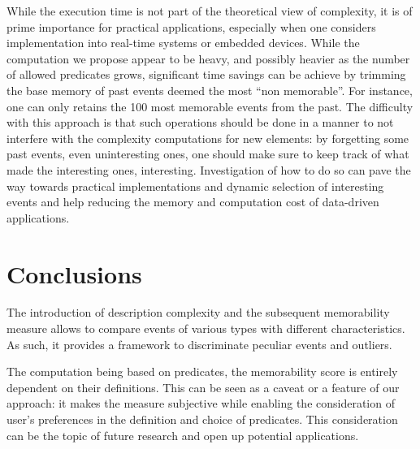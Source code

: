 \documentclass[entropy,article,submit,moreauthors,pdftex]{Definitions/mdpi}
\begin{document}
While the execution time is not part of the theoretical view of complexity, it
is of prime importance for practical applications, especially when one considers
implementation into real-time systems or embedded devices. While the computation
we propose appear to be heavy, and possibly heavier as the number of allowed
predicates grows, significant time savings can be achieve by trimming the base
memory of past events deemed the most ``non memorable''. For instance, one can
only retains the 100 most memorable events from the past. The difficulty with
this approach is that such operations should be done in a manner to not
interfere with the complexity computations for new elements: by forgetting some
past events, even uninteresting ones, one should make sure to keep track of what
made the interesting ones, interesting. Investigation of how to do so can pave
the way towards practical implementations and dynamic selection of interesting
events and help reducing the memory and computation cost of data-driven applications.


\section{Conclusions}
The introduction of description complexity and the subsequent memorability measure allows to compare events of various types with different characteristics. As such, it provides a framework to discriminate peculiar events and outliers.

The computation being based on predicates, the memorability score is entirely dependent on their definitions. This can be seen as a caveat or a feature of our approach: it makes the measure subjective while enabling the consideration of user's preferences in the definition and choice of predicates. This consideration can be the topic of future research and open up potential applications.



\vspace{6pt}


\end{document}
